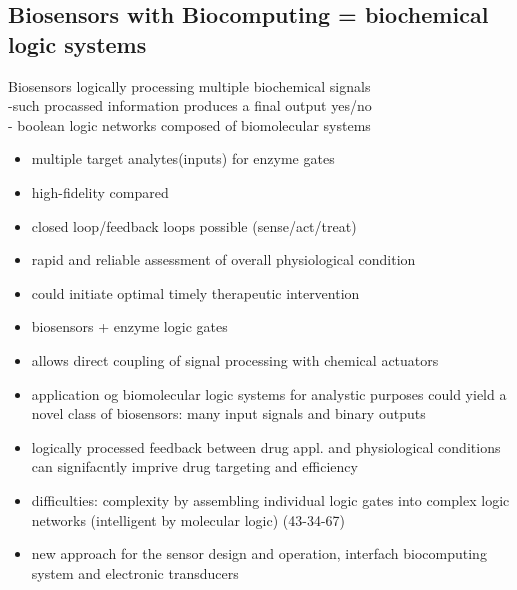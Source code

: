 \documentclass[runningheads]{llncs}
\begin{document}
\subsection{Biosensors with Biocomputing = biochemical logic systems}
		Biosensors logically processing multiple biochemical signals\\
		-such procassed information produces a final output yes/no \\
		- boolean logic networks composed of biomolecular systems\\	
		\begin{itemize}
			\item multiple target analytes(inputs) for enzyme gates
			\item high-fidelity compared
			\item closed loop/feedback loops possible (sense/act/treat)
			\item rapid and reliable assessment of overall physiological condition
			\item could initiate optimal timely therapeutic intervention
			\item biosensors + enzyme logic gates
			\item allows direct coupling of signal processing with chemical actuators 
			\item application og biomolecular logic systems for analystic purposes could yield a novel class of biosensors: many input signals and binary outputs
			\item logically processed feedback between drug appl. and physiological conditions can signifacntly imprive drug targeting and efficiency 
			
			\item difficulties: complexity by assembling individual logic gates into complex logic networks (intelligent by molecular logic) (43-34-67)
			\item new approach for the sensor design and operation, interfach biocomputing system and electronic transducers
		\end{itemize}
\end{document}
